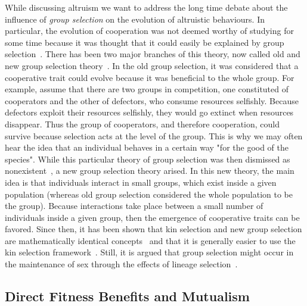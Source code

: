     While discussing altruism we want to address the long time debate about the influence of \emph{group selection} on the evolution of altruistic behaviours. In particular, the evolution of cooperation was not deemed worthy of studying for some time because it was thought that it could easily be explained by group selection~\parencite{Axelrod1981}. There has been two major branches of this theory, now called old and new group selection theory~\parencite{West2007a}. In the old group selection, it was considered that a cooperative trait could evolve because it was beneficial to the whole group. For example, assume that there are two groups in competition, one constituted of cooperators and the other of defectors, who consume resources selfishly. Because defectors exploit their resources selfishly, they would go extinct when resources disappear. Thus the group of cooperators, and therefore cooperation, could survive because selection acts at the level of the group. This is why we may often hear the idea that an individual behaves in a certain way "for the good of the species". While this particular theory of group selection was then dismissed as nonexistent~\parencite{MaynardSmith1976}, a new group selection theory arised. In this new theory, the main idea is that individuals interact in small groups, which exist inside a given population (whereas old group selection considered the whole population to be the group). Because interactions take place between a small number of individuals inside a given group, then the emergence of cooperative traits can be favored. Since then, it has been shown that kin selection and new group selection are mathematically identical concepts~\parencite{Hamilton1975, VanBaalen1998, Gardner2007} and that it is generally easier to use the kin selection framework~\parencite{West2007a}. Still, it is argued that group selection might occur in the maintenance of sex through the effects of lineage selection~\parencite{Nunney1989, DeVienne2013}.


  \subsection{Direct Fitness Benefits and Mutualism}

